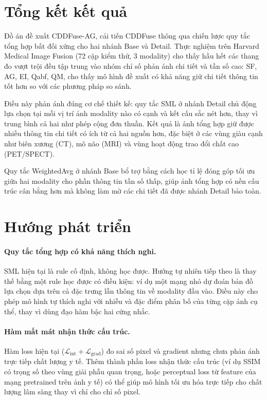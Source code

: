\section{Tổng kết kết quả}
\label{sec:summary}

Đồ án đề xuất CDDFuse-AG, cải tiến CDDFuse thông qua chiến lược quy tắc tổng hợp bất đối xứng cho hai nhánh Base và Detail. Thực nghiệm trên Harvard Medical Image Fusion (72 cặp kiểm thử, 3 modality) cho thấy hầu hết các thang đo vượt trội đều tập trung vào nhóm chỉ số phản ánh chi tiết và tần số cao: SF, AG, EI, Qabf, QM, cho thấy mô hình đề xuất có khả năng giữ chi tiết thông tin tốt hơn so với các phương pháp so sánh.

Điều này phản ánh đúng cơ chế thiết kế: quy tắc SML ở nhánh Detail chủ động lựa chọn tại mỗi vị trí ảnh modality nào có cạnh và kết cấu sắc nét hơn, thay vì trung bình cả hai như phép cộng đơn thuần. Kết quả là ảnh tổng hợp giữ được nhiều thông tin chi tiết có ích từ cả hai nguồn hơn, đặc biệt ở các vùng giàu cạnh như biên xương (CT), mô não (MRI) và vùng hoạt động trao đổi chất cao (PET/SPECT).

Quy tắc WeightedAvg ở nhánh Base bổ trợ bằng cách học tỉ lệ đóng góp tối ưu giữa hai modality cho phần thông tin tần số thấp, giúp ảnh tổng hợp có nền cấu trúc cân bằng hơn mà không làm mờ các chi tiết đã được nhánh Detail bảo toàn.

\section{Hướng phát triển}
\label{sec:future}

\paragraph{Quy tắc tổng hợp có khả năng thích nghi.}
SML hiện tại là rule cố định, không học được. Hướng tự nhiên tiếp theo là thay thế bằng một rule học được có điều kiện: ví dụ một mạng nhỏ dự đoán bản đồ lựa chọn dựa trên cả đặc trưng lẫn thông tin về modality đầu vào. Điều này cho phép mô hình tự thích nghi với nhiễu và đặc điểm phân bố của từng cặp ảnh cụ thể, thay vì dùng đạo hàm bậc hai cứng nhắc.

\paragraph{Hàm mất mát nhận thức cấu trúc.}
Hàm loss hiện tại ($\mathcal{L}_{\mathrm{int}} + \mathcal{L}_{\mathrm{grad}}$) đo sai số pixel và gradient nhưng chưa phản ánh trực tiếp chất lượng y tế. Thêm thành phần loss nhận thức cấu trúc (ví dụ SSIM có trọng số theo vùng giải phẫu quan trọng, hoặc perceptual loss từ feature của mạng pretrained trên ảnh y tế) có thể giúp mô hình tối ưu hóa trực tiếp cho chất lượng lâm sàng thay vì chỉ cho chỉ số pixel.

